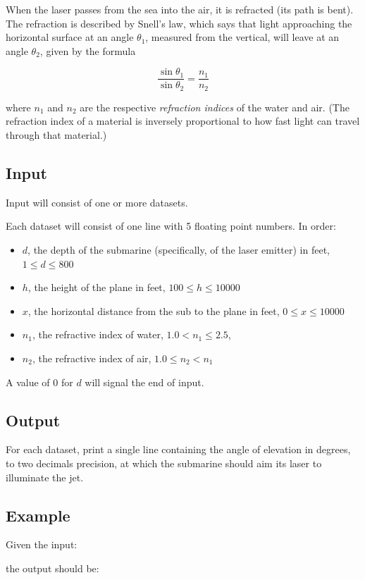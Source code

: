 When the laser passes from the sea into the air, it is refracted (its path is bent). The refraction is described by Snell's law, which says that light approaching the horizontal surface at an angle $\theta_1$, measured from the vertical, will leave at an angle $\theta_2$, given by the formula

\[ \frac{\sin \theta_1}{\sin \theta_2} = \frac{n_1}{n_2} \]

\noindent
where $n_1$ and $n_2$ are the respective {\em refraction indices} of
the water and air. (The refraction index of a material is inversely
proportional to how fast light can travel through that material.)

\subsection*{Input}

Input will consist of one or more datasets. 

Each dataset will consist of one line with 5 floating point
numbers. In order:

\begin{itemize}

\item $d$, the depth of the submarine (specifically, of the laser
  emitter) in feet, $1 \leq d \leq 800$

\item $h$, the height of the plane in feet, $100 \leq h \leq \num{10000}$

\item $x$, the horizontal distance from the sub to the plane in feet,
  $0 \leq x \leq \num{10000}$

\item $n_1$, the refractive index of water, $1.0 < n_1 \leq 2.5$, 

\item $n_2$, the refractive index of air, $1.0 \leq n_2 < n_1$ 
\end{itemize}

A value of 0 for $d$ will signal the end of input.

\subsection*{Output}

For each dataset, print a single line containing the angle of
elevation in degrees, to two decimals precision, at
which the submarine should aim its laser to illuminate the jet.




\subsection*{Example}

Given the input:



the output should be:




